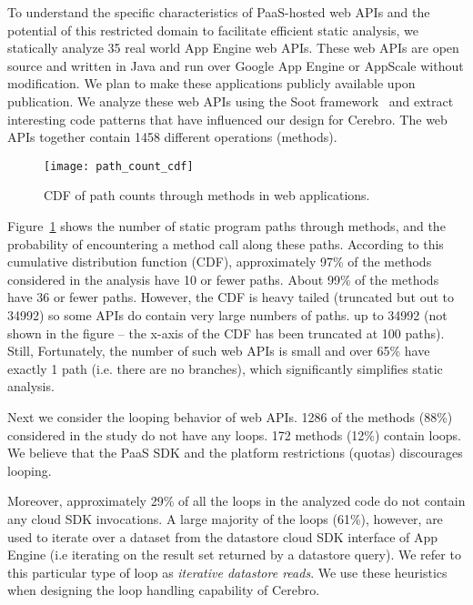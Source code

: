 To understand the specific characteristics of PaaS-hosted web APIs and the potential
of this restricted domain to facilitate efficient static analysis, 
we statically analyze 35 real world App Engine web APIs. These web APIs are open 
source and written in Java and run over Google App Engine or AppScale without modification.
We plan to make these applications publicly available upon publication.
We analyze these web APIs 
using the Soot framework~\cite{Vallee-Rai:2010:SJB:1925805.1925818} 
and extract interesting code patterns that have influenced our design for Cerebro.
The web APIs together contain 1458 different operations (methods).

\begin{figure}
\centering
\texttt{[image: path\_count\_cdf]}
\caption{CDF of path counts through methods in web applications.}
\label{fig:path_count_cdf}
\end{figure}

Figure~\ref{fig:path_count_cdf} shows the number of static program paths through methods, 
and the probability of encountering
a method call along these paths. According to this cumulative distribution 
function (CDF), 
approximately 97\% of the methods considered in the analysis have 10 or fewer paths. 
About 99\% of 
the methods have 36 or fewer paths. However, the CDF is heavy tailed
(truncated but out to 34992) so some APIs do contain very large numbers of paths.
up to 34992 (not shown in the figure -- the x-axis of the CDF has been truncated at 100 paths). Still, 
Fortunately, the number of such web APIs is small and over
65\% have exactly 1 path (i.e. there are no branches), which significantly simplifies
static analysis.

Next we consider the looping behavior of web APIs. 
1286 of the methods (88\%)
considered in the study
do not have any loops. 172 methods (12\%) contain loops. 
We believe that the PaaS SDK and the platform restrictions (quotas) discourages 
looping.

Moreover, approximately 29\% of all the loops in 
the analyzed code do not contain any cloud SDK invocations. 
A large majority of the loops (61\%), however, are
used to iterate over a dataset from the datastore cloud SDK interface 
of App Engine (i.e iterating on the result set 
returned by a datastore query). We refer to this particular type of 
loop as \textit{iterative datastore reads}. 
We use these heuristics when designing the loop handling capability of Cerebro.

